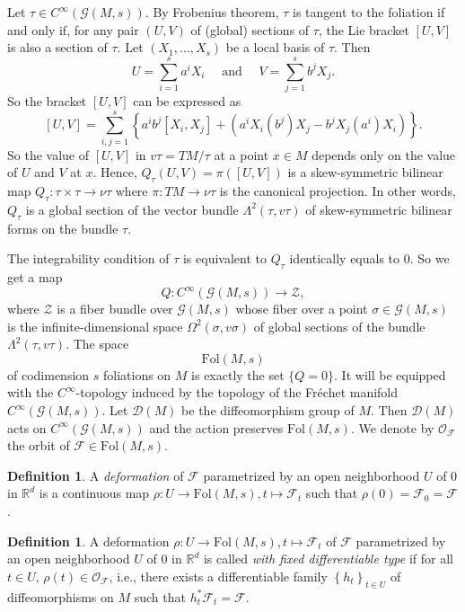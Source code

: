 \documentclass[12pt]{amsart}
\numberwithin{equation}{section}
\theoremstyle{definition}
\theoremstyle{definition}
\newtheorem{definition}  [theorem]     {Definition}
\theoremstyle{definition}
\renewcommand{\1}{\mathsf{1}}
\renewcommand{\>}{\rightarrow}
\def\mc{\mathcal}
\theoremstyle{plain} %
\theoremstyle{plain} %
\theoremstyle{plain} %
\begin{document}
Let $\tau \in C^{\infty}(\mathcal{G}(M,s))$. By Frobenius theorem, $\tau$ is tangent to the foliation if and only if, for any pair $(U, V)$ of (global) sections of $\tau$, the Lie bracket $[U, V]$ is also a section of $\tau$. Let $\left(X_{1}, \ldots, X_{s}\right)$ be a local basis of $\tau$. Then
	$$
	U=\sum_{i=1}^{s} a^{i} X_{i} \quad \text { and } \quad V=\sum_{j=1}^{s} b^{j} X_{j}.
	$$
	So the bracket $[U, V]$ can be expressed as
	$$
	[U, V]=\sum_{i, j=1}^{s}\left\{a^{i} b^{j}\left[X_{i}, X_{j}\right]+\left(a^{i} X_{i}\left(b^{j}\right) X_{j}-b^{j} X_{j}\left(a^{i}\right) X_{i}\right)\right\}.
	$$
	So the value of $[U, V]$ in $v \tau=T M / \tau$ at a point $x \in M$ depends only on the value of $U$ and $V$ at $x$. Hence, $Q_{\tau}(U, V)=\pi \left([U,V]\right)$ is a skew-symmetric bilinear map $Q_{\tau}: \tau \times \tau \rightarrow \nu \tau$ where $\pi: T M \rightarrow \nu \tau$ is the canonical projection. In other words, $Q_{\tau}$ is a global section of the vector bundle $\Lambda^{2}(\tau, v \tau)$ of skew-symmetric bilinear forms on the bundle $\tau$. 
    
The integrability condition of $\tau$ is equivalent to $Q_{\tau}$ identically equals to $0$. So we get a map $$Q: C^{\infty}(\mathcal{G}(M,s)) \longrightarrow \mathscr Z,$$ where $\mathscr Z$ is a fiber bundle over $\mathcal{G}(M,s)$ whose fiber over a point $\sigma \in \mathcal{G}(M,s)$ is the infinite-dimensional space $\Omega^{2}(\sigma, v \sigma)$ of global sections of the bundle $\Lambda^{2}(\tau, v \tau)$. The space $$\mathrm{Fol}(M, s)$$ of codimension $s$ foliations on $M$ is exactly the set $\{Q=0\} .$ It will be equipped with the $C^{\infty}$-topology induced by the topology of the Fr\'echet manifold $C^{\infty}(\mathcal{G}(M,s)).$  Let $\mathcal{D}(M)$ be the diffeomorphism group of $M$. Then $\mathcal{D}(M)$ acts on $C^{\infty}(\mathcal{G}(M,s))$ and the action preserves $\mathrm{Fol}(M, s)$. We denote by $\mathcal O_\mathcal F$ the orbit of $\mathcal F\in\mathrm{Fol}(M,s)$.
	
	\begin{definition}
		A \textit{deformation} of $\mathcal F$ parametrized  by an open neighborhood $U$ of 0 in $\mathbb{R}^{d}$ is a continuous map $\rho: U \rightarrow \mathrm{Fol}(M,s), t\mapsto \mathcal F_t$
		such that $\rho(0)=\mc F_0=\mc F$.
	\end{definition}
	\begin{definition}
		A deformation $\rho: U \rightarrow \mathrm{Fol}(M,s), t\mapsto \mathcal F_t$ of $\mc F$ parametrized  by an open neighborhood $U$ of 0 in $\mathbb{R}^{d}$ is called \textit{with fixed differentiable type} if for all $t\in U,\,\rho(t)\in\mathcal O_\mc F$, i.e., there exists a differentiable  family $\left\{h_t\right\}_{t\in U}$ of diffeomorphisms on $M$ such that $h_t^*\mathcal F_t=\mc F$.
	\end{definition}
	
\end{document}
